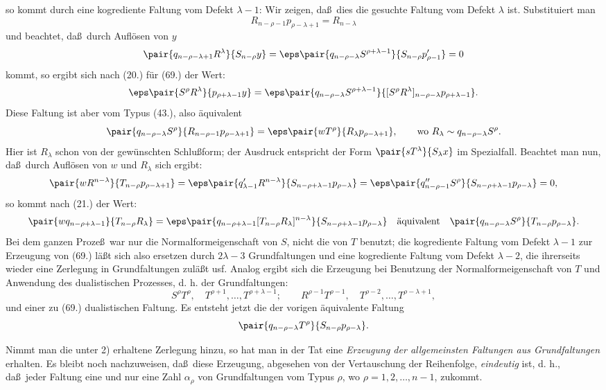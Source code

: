 so kommt durch eine kogrediente Faltung vom Defekt $\lambda-1$:
Wir zeigen, da\ss\ dies die gesuchte Faltung vom Defekt $\lambda$ ist. Substituiert man
\[
 R_{n-\rho-1}p_{\rho-\lambda+1}=R_{n-\lambda}
\]
und beachtet, da\ss\ durch Aufl\"osen von $y$
\[
 \pair{q_{n-\rho-\lambda+1}R^\lambda}{S_{n-\rho}y}
 =\eps\pair{q_{n-\rho-\lambda}S^{\rho+\lambda-1}}{S_{n-\rho}p'_{\rho-1}}=0
\]
kommt, so ergibt sich nach (20.) f\"ur (69.) der Wert:
\[
 \eps\pair{S^\rho R^\lambda}{p_{\rho+\lambda-1}y}
 =\eps\pair{q_{n-\rho-\lambda}S^{\rho+\lambda-1}}{[S^\rho R^\lambda]_{n-\rho-\lambda}p_{\rho+\lambda-1}}.
\]
Diese Faltung ist aber vom Typus (43.), also \"aquivalent
\[
 \pair{q_{n-\rho-\lambda}S^\rho}{R_{n-\rho-1}p_{\rho-\lambda+1}}
 =\eps\pair{wT^\rho}{R_\lambda p_{\rho-\lambda+1}},
 \qquad \text{wo }R_\lambda\sim q_{n-\rho-\lambda}S^\rho.
\]
Hier ist $R_\lambda$ schon von der gew\"unschten Schlu\ss{}form; der Ausdruck entspricht der Form $\pair{sT^\lambda}{S_\lambda x}$ im Spezialfall. Beachtet man nun, da\ss\ durch Aufl\"osen von $w$ und $R_\lambda$ sich ergibt:
\[
 \pair{wR^{n-\lambda}}{T_{n-\rho}p_{\rho-\lambda+1}}
 =\eps\pair{q'_{\lambda-1}R^{n-\lambda}}{S_{n-\rho+\lambda-1}p_{\rho-\lambda}}
 =\eps\pair{q''_{n-\rho-1}S^\rho}{S_{n-\rho+\lambda-1}p_{\rho-\lambda}}=0,
\]
so kommt nach (21.) der Wert:
\[
 \pair{wq_{n-\rho+\lambda-1}}{T_{n-\rho}R_\lambda}
 =\eps\pair{q_{n-\rho+\lambda-1}[T_{n-\rho}R_\lambda]^{n-\lambda}}{S_{n-\rho+\lambda-1}p_{\rho-\lambda}}
 \quad\text{\"aquivalent}\quad
 \pair{q_{n-\rho-\lambda}S^\rho}{T_{n-\rho}p_{\rho-\lambda}}.
\]
Bei dem ganzen Proze\ss\ war nur die Normalformeigenschaft von $S$, nicht die von $T$ benutzt; die kogrediente Faltung vom Defekt $\lambda-1$ zur Erzeugung von (69.) l\"a\ss t sich also ersetzen durch $2\lambda-3$ Grundfaltungen und eine kogrediente Faltung vom Defekt $\lambda-2$, die ihrerseits wieder eine Zerlegung in Grundfaltungen zul\"a\ss t usf. Analog ergibt sich die Erzeugung bei Benutzung der Normalformeigenschaft von $T$ und Anwendung des dualistischen Prozesses, d. h. der Grundfaltungen:
\[
 S^\rho T^\rho,\quad T^{\rho+1},\ldots,T^{\rho+\lambda-1};
 \qquad R^{\rho-1}T^{\rho-1},\quad T^{\rho-2},\ldots,T^{\rho-\lambda+1},
\]
und einer zu (69.) dualistischen Faltung. Es entsteht jetzt die der vorigen \"aquivalente Faltung
\[
 \pair{q_{n-\rho-\lambda}T^\rho}{S_{n-\rho}p_{\rho-\lambda}}.
\]

Nimmt man die unter 2) erhaltene Zerlegung hinzu, so hat man in der Tat eine \emph{Erzeugung der allgemeinsten Faltungen aus Grundfaltungen} erhalten. Es bleibt noch nachzuweisen, da\ss\ diese Erzeugung, abgesehen von der Vertauschung der Reihenfolge, \emph{eindeutig} ist, d. h., da\ss\ jeder Faltung eine und nur eine Zahl $\alpha_\rho$ von Grundfaltungen vom Typus $\rho$, wo $\rho=1,2,\ldots,n-1$, zukommt.

